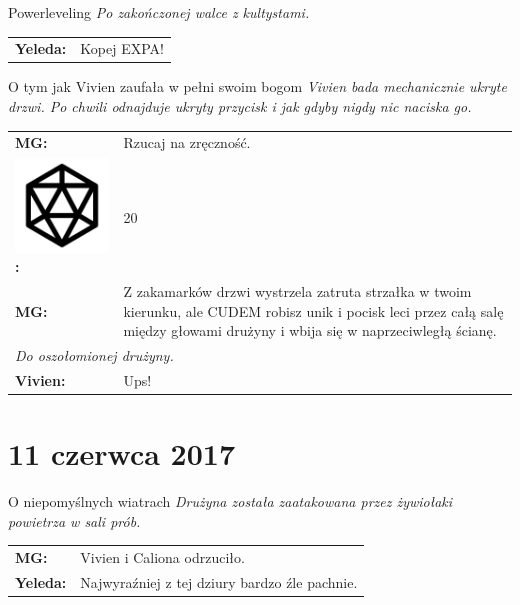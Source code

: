 \documentclass[10pt,twoside,twocolumn]{book}
\begin{document}
\begin{rpg-quotebox}{Powerleveling}
   \textit{Po zakończonej walce z kultystami.}\\
   
   \begin{tabularx}{\columnwidth}{lX}
      \textbf{Yeleda:} & Kopej EXPA!
   \end{tabularx}
\end{rpg-quotebox}


\begin{rpg-quotebox}{O tym jak Vivien zaufała w pełni swoim bogom}
   \textit{Vivien bada mechanicznie ukryte drzwi. Po chwili odnajduje ukryty przycisk i jak gdyby nigdy nic naciska go.}\\
   
   \begin{tabularx}{\columnwidth}{lX}
      \textbf{MG:} & Rzucaj na zręczność.\\
      \includegraphics[scale=0.06]{img/d20.png}\textbf{:}& 20\\
      \textbf{MG:} & Z zakamarków drzwi wystrzela zatruta strzałka w twoim kierunku, ale CUDEM robisz unik i    pocisk leci przez całą salę między głowami drużyny i wbija się w naprzeciwległą ścianę.\\
      \multicolumn{2}{l}{\textit{Do oszołomionej drużyny.}}\\
      \textbf{Vivien:} & Ups!\\
   \end{tabularx}
\end{rpg-quotebox}

\section*{11 czerwca 2017}



\begin{rpg-quotebox}{O niepomyślnych wiatrach}
   \textit{Drużyna została zaatakowana przez żywiołaki powietrza w sali prób.}\\\newline
   \begin{tabularx}{\columnwidth}{lX}
      \textbf{MG:} & Vivien i Caliona odrzuciło.\\
      \textbf{Yeleda:} & Najwyraźniej z tej dziury bardzo źle pachnie.
   \end{tabularx}
\end{rpg-quotebox}
\end{document}
